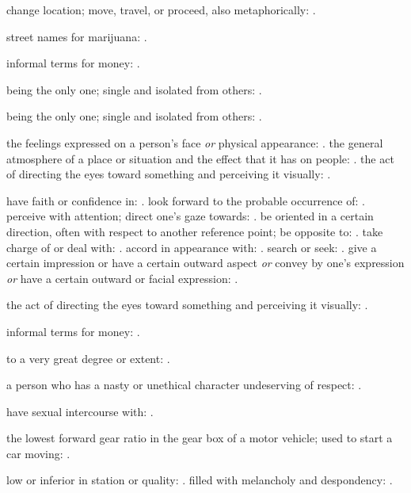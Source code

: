   change location; move, travel, or proceed, also metaphorically: .

  street names for marijuana: .

  informal terms for money: .

  being the only one; single and isolated from others: .

  being the only one; single and isolated from others: .

  the feelings expressed on a person's face \textit{or} physical appearance: . the general atmosphere of a place or situation and the effect that it has on people: . the act of directing the eyes toward something and perceiving it visually: .

  have faith or confidence in: . look forward to the probable occurrence of: . perceive with attention; direct one's gaze towards: . be oriented in a certain direction, often with respect to another reference point; be opposite to: . take charge of or deal with: . accord in appearance with: . search or seek: . give a certain impression or have a certain outward aspect \textit{or} convey by one's expression \textit{or} have a certain outward or facial expression: .

  the act of directing the eyes toward something and perceiving it visually: .

  informal terms for money: .

  to a very great degree or extent: .

  a person who has a nasty or unethical character undeserving of respect: .

  have sexual intercourse with: .

  the lowest forward gear ratio in the gear box of a motor vehicle; used to start a car moving: .

  low or inferior in station or quality: . filled with melancholy and despondency: .

